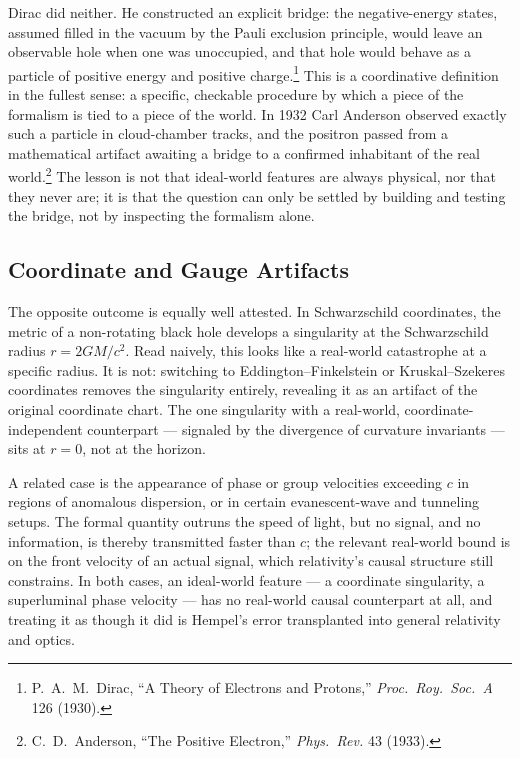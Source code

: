 \documentclass[11pt]{book}
\begin{document}
Dirac did neither. He constructed an explicit bridge: the negative-energy states, assumed filled in the vacuum by the Pauli exclusion principle, would leave an observable hole when one was unoccupied, and that hole would behave as a particle of positive energy and positive charge.\footnote{P.\ A.\ M.\ Dirac, ``A Theory of Electrons and Protons,'' \emph{Proc.\ Roy.\ Soc.\ A} 126 (1930).} This is a coordinative definition in the fullest sense: a specific, checkable procedure by which a piece of the formalism is tied to a piece of the world. In 1932 Carl Anderson observed exactly such a particle in cloud-chamber tracks, and the positron passed from a mathematical artifact awaiting a bridge to a confirmed inhabitant of the real world.\footnote{C.\ D.\ Anderson, ``The Positive Electron,'' \emph{Phys.\ Rev.} 43 (1933).} The lesson is not that ideal-world features are always physical, nor that they never are; it is that the question can only be settled by building and testing the bridge, not by inspecting the formalism alone.

\subsection{Coordinate and Gauge Artifacts}

The opposite outcome is equally well attested. In Schwarzschild coordinates, the metric of a non-rotating black hole develops a singularity at the Schwarzschild radius $r = 2GM/c^2$. Read naively, this looks like a real-world catastrophe at a specific radius. It is not: switching to Eddington--Finkelstein or Kruskal--Szekeres coordinates removes the singularity entirely, revealing it as an artifact of the original coordinate chart. The one singularity with a real-world, coordinate-independent counterpart --- signaled by the divergence of curvature invariants --- sits at $r=0$, not at the horizon.

A related case is the appearance of phase or group velocities exceeding $c$ in regions of anomalous dispersion, or in certain evanescent-wave and tunneling setups. The formal quantity outruns the speed of light, but no signal, and no information, is thereby transmitted faster than $c$; the relevant real-world bound is on the front velocity of an actual signal, which relativity's causal structure still constrains. In both cases, an ideal-world feature --- a coordinate singularity, a superluminal phase velocity --- has no real-world causal counterpart at all, and treating it as though it did is Hempel's error transplanted into general relativity and optics.
\end{document}
